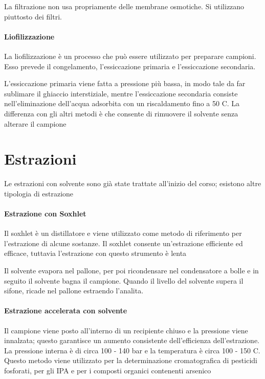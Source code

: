 
La filtrazione non usa propriamente delle membrane osmotiche. Si utilizzano piuttosto dei filtri.

\paragraph{Liofilizzazione}
La liofilizzazione è un processo che può essere utilizzato per preparare campioni. Esso prevede il congelamento, l'essiccazione primaria e l'essiccazione secondaria.


L'essiccazione primaria viene fatta a pressione più bassa, in modo tale da far sublimare il ghiaccio interstiziale, mentre l'essiccazione secondaria consiste nell'eliminazione dell'acqua adsorbita con un riscaldamento fino a 50 \degree C.
La differenza con gli altri metodi è che consente di rimuovere il solvente senza alterare il campione

\section{Estrazioni}
Le estrazioni con solvente sono già state trattate all'inizio del corso; esistono altre tipologia di estrazione

\paragraph{Estrazione con Soxhlet}
Il soxhlet è un distillatore e viene utilizzato come metodo di riferimento per l'estrazione di alcune sostanze. Il soxhlet consente un'estrazione efficiente ed efficace, tuttavia l'estrazione con questo strumento è lenta


Il solvente evapora nel pallone, per poi ricondensare nel condensatore a bolle e in seguito il solvente bagna il campione.
Quando il livello del solvente supera il sifone, ricade nel pallone estraendo l'analita.

\paragraph{Estrazione accelerata con solvente}
Il campione viene posto all'interno di un recipiente chiuso e la pressione viene innalzata; questo garantisce un aumento consistente dell'efficienza dell'estrazione.
La pressione interna è di circa 100 - 140 bar e la temperatura è circa 100 - 150 \degree C. 
Questo metodo viene utilizzato per la determinazione cromatografica di pesticidi fosforati, per gli IPA e per i composti organici contenenti arsenico

